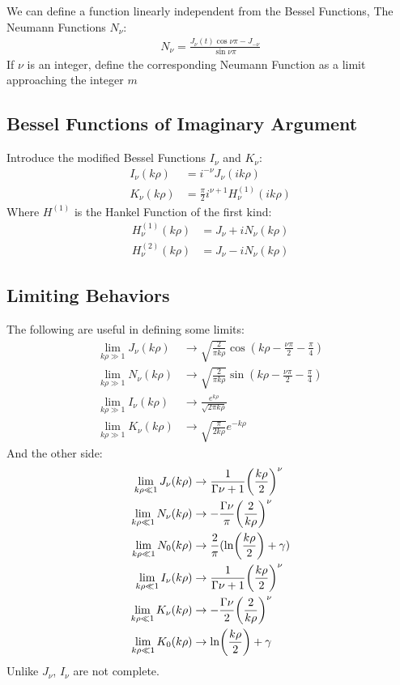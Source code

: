 \documentclass[12pt]{article}
\theoremstyle{plain}
\theoremstyle{definition}
\begin{document}
We can define a function linearly independent from the Bessel Functions, The Neumann Functions $N_\nu$:
\begin{align*}
  N_\nu=\frac{J_\nu(t)\cos\nu\pi-J_{-\nu}}{\sin\nu\pi}
\end{align*}
If $\nu$ is an integer, define the corresponding Neumann Function as a limit approaching the integer $m$

\subsection{Bessel Functions of Imaginary Argument}
Introduce the modified Bessel Functions $I_\nu$ and $K_\nu$:
\begin{align*}
  I_\nu(k\rho)&=i^{-\nu}J_\nu(ik\rho)\\
  K_\nu(k\rho)&=\frac\pi2 i^{\nu+1}H_\nu^{(1)}(ik\rho)
\end{align*}
Where $H^{(1)}$ is the Hankel Function of the first kind:
\begin{align*}
  H^{(1)}_{\nu}(k\rho)&=J_\nu+iN_\nu(k\rho)\\
  H^{(2)}_{\nu}(k\rho)&=J_\nu-iN_\nu(k\rho)
\end{align*}

\subsection{Limiting Behaviors}
The following are useful in defining some limits:
\begin{align*}
  \lim_{k\rho\gg 1}J_\nu(k\rho)&\to\sqrt{\frac{2}{\pi k\rho}}
  \cos(k\rho-\frac{\nu\pi}{2}-\frac{\pi}{4})\\
  \lim_{k\rho\gg 1}N_\nu(k\rho)&\to\sqrt{\frac{2}{\pi k\rho}}
  \sin(k\rho-\frac{\nu\pi}{2}-\frac{\pi}{4})\\
  \lim_{k\rho\gg 1}I_\nu(k\rho)&\to\frac{e^{k\rho}}{\sqrt{2\pi k\rho}}\\
  \lim_{k\rho\gg 1}K_\nu(k\rho)&\to\sqrt{\frac{\pi}{2k\rho}}e^{-k\rho}
\end{align*}
And the other side:
\begin{align*}
  \lim_{k\rho\ll 1}J_\nu(k\rho)&\to
  \frac1{\Gamma{\nu+1}}\qty(\frac{k\rho}{2})^\nu\\
  \lim_{k\rho\ll 1}N_\nu(k\rho)&\to
  -\frac{\Gamma{\nu}}{\pi}\qty(\frac{2}{k\rho})^\nu\\
  \lim_{k\rho\ll 1}N_0(k\rho)&\to\frac2\pi(\ln(\frac{k\rho}{2})+\gamma)\\
  \lim_{k\rho\ll 1}I_\nu(k\rho)&\to
  \frac1{\Gamma{\nu+1}}\qty(\frac{k\rho}{2})^\nu\\
  \lim_{k\rho\ll 1}K_\nu(k\rho)&\to
  -\frac{\Gamma{\nu}}{2}\qty(\frac{2}{k\rho})^\nu\\
  \lim_{k\rho\ll 1}K_0(k\rho)&\to \ln(\frac{k\rho}{2})+\gamma\\
\end{align*}
Unlike $J_\nu$, $I_\nu$ are not complete.
\end{document}
